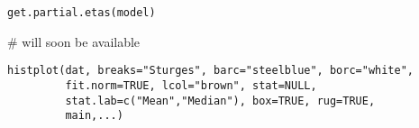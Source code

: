 \documentclass[a4paper]{book}
\begin{document}
\newpage
{}
%
\begin{Usage}
\begin{verbatim}
get.partial.etas(model)
\end{verbatim}
\end{Usage}
%
\begin{Arguments}
\begin{ldescription}
\item[\code{model}] 


\end{ldescription}
\end{Arguments}
%
\begin{Examples}
\begin{ExampleCode}
# will soon be available
\end{ExampleCode}
\end{Examples}
\newpage
{}
%
\begin{Usage}
\begin{verbatim}
histplot(dat, breaks="Sturges", barc="steelblue", borc="white",
         fit.norm=TRUE, lcol="brown", stat=NULL, 
         stat.lab=c("Mean","Median"), box=TRUE, rug=TRUE, 
         main,...)


\end{verbatim}
\end{Usage}
%
\end{document}
